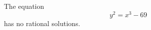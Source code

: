 \begin{proposition}
    The equation
\[
    y^2=x^3-69
\]
    has no rational solutions.
\end{proposition}
